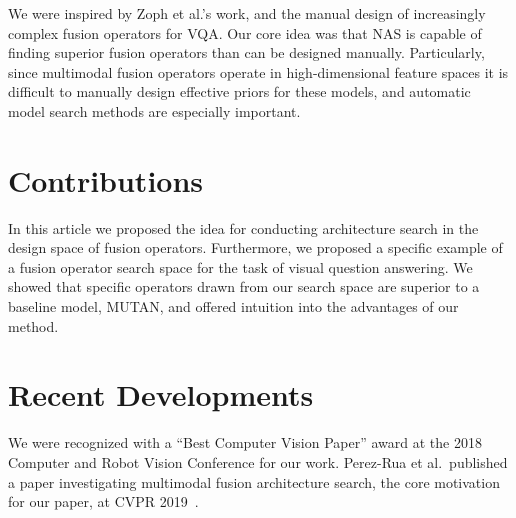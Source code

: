 We were inspired by Zoph et al.'s work, and the manual design of increasingly
complex fusion operators for VQA.
Our core idea was that NAS is capable of finding superior fusion operators than
can be designed manually.
Particularly, since multimodal fusion operators operate in high-dimensional
feature spaces it is difficult to manually design effective priors for these
models, and automatic model search methods are especially important.


\section{Contributions}

In this article we proposed the idea for conducting architecture search in the
design space of fusion operators.
Furthermore, we proposed a specific example of a fusion operator search space
for the task of visual question answering.
We showed that specific operators drawn from our search space are superior to a
baseline model, MUTAN, and offered intuition into the advantages of our method.


\section{Recent Developments}

We were recognized with a ``Best Computer Vision Paper'' award at the 2018
Computer and Robot Vision Conference for our work.
Perez-Rua et al.\ published a paper investigating multimodal fusion architecture
search, the core motivation for our paper, at CVPR
2019~\citep{Perez-Rua2019mfas}.
